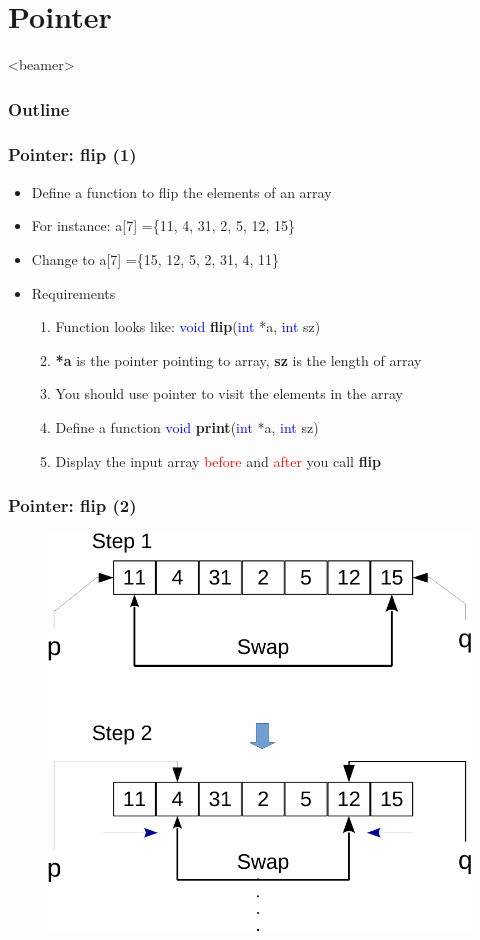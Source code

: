 \section{Pointer}
\label{sec:point}
\begin{frame}<beamer>
    \frametitle{Outline}
    \tableofcontents[currentsection]
\end{frame}

\begin{frame}
\frametitle{Pointer: flip (1)}
\begin{itemize}
	\item {Define a function to flip the elements of an array}
	\item {For instance:}
	a[7] =\{11, 4, 31, 2, 5, 12, 15\}
	\item {Change to}
	a[7] =\{15, 12, 5, 2, 31, 4, 11\}
\end{itemize}

\begin{itemize}
	\item {Requirements}
	\begin{enumerate}
	
		\item {Function looks like: \textcolor{blue}{void} \textbf{flip}(\textcolor{blue}{int} *a, \textcolor{blue}{int} sz)}
		\item {\textbf{*a} is the pointer pointing to array, \textbf{sz} is the length of array}
		\item {You should use pointer to visit the elements in the array}
		\item {Define a function \textcolor{blue}{void} \textbf{print}(\textcolor{blue}{int} *a, \textcolor{blue}{int} sz)}
		\item {Display the input array \textcolor{red}{before} and \textcolor{red}{after} you call \textbf{flip}}
	\end{enumerate}
\end{itemize}
\end{frame}


\begin{frame}
\frametitle{Pointer: flip (2)}
\vspace{-0.2in}
\begin{figure}
	\begin{center}
		\includegraphics[width=0.65\linewidth]{figs/flip_demo.pdf}
	\end{center}
\end{figure}
\end{frame}

